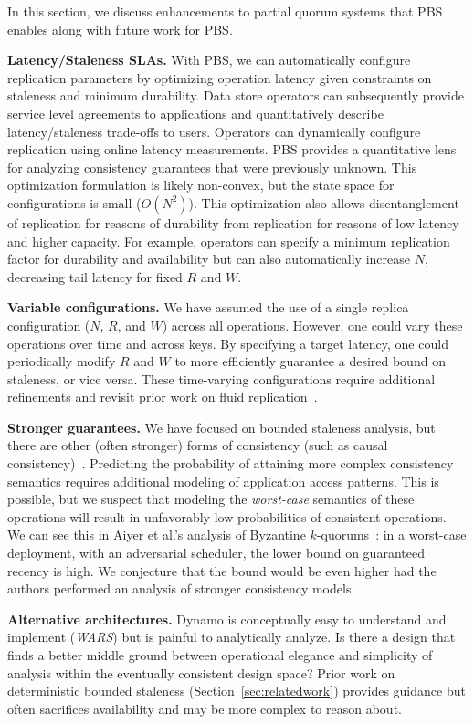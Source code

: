 \documentclass{vldb}
\begin{document}
In this section, we discuss enhancements to partial quorum
systems that PBS enables along with future work for PBS.

\textbf{Latency/Staleness SLAs.} With PBS, we can automatically
configure replication parameters by optimizing operation latency given
constraints on staleness and minimum durability.  Data store operators
can subsequently provide service level agreements to applications and
quantitatively describe latency/staleness trade-offs to users.
Operators can dynamically configure replication using online latency
measurements.  PBS provides a quantitative lens for analyzing
consistency guarantees that were previously unknown.  This
optimization formulation is likely non-convex, but the state space for
configurations is small ($O(N^2)$).  This optimization also allows
disentanglement of replication for reasons of durability from
replication for reasons of low latency and higher capacity.  For
example, operators can specify a minimum replication factor for
durability and availability but can also automatically increase
$N$, decreasing tail latency for fixed $R$ and $W$.

\textbf{Variable configurations.} We have assumed the use of a single
replica configuration ($N$, $R$, and $W$) across all operations.
However, one could vary these operations over time and across keys.
By specifying a target latency, one could periodically modify $R$ and
$W$ to more efficiently guarantee a desired bound on staleness, or
vice versa. These time-varying configurations require additional
refinements and revisit prior work on fluid
replication~\cite{fluidreplication}.

\textbf{Stronger guarantees.} We have focused on bounded staleness
analysis, but there are other (often stronger) forms of
consistency (such as causal consistency)~\cite{vogels-defs}.
Predicting the probability of attaining more complex consistency
semantics requires additional modeling of application access patterns.
This is possible, but we suspect that modeling the \textit{worst-case}
semantics of these operations will result in unfavorably low
probabilities of consistent operations.  We can see this in Aiyer et
al.'s analysis of Byzantine $k$-quorums~\cite{multi-k-quorum}: in a
worst-case deployment, with an adversarial scheduler, the lower bound
on guaranteed recency is high.  We conjecture that the bound
would be even higher had the authors performed an analysis of stronger
consistency models.

\textbf{Alternative architectures.} Dynamo is conceptually easy to
understand and implement (\textit{WARS}) but is painful to
analytically analyze.  Is there a design that finds a better middle
ground between operational elegance and simplicity of analysis within
the eventually consistent design space?  Prior work on deterministic
bounded staleness (Section~\ref{sec:relatedwork}) provides guidance
but often sacrifices availability and may be more complex to reason
about.
\end{document}
